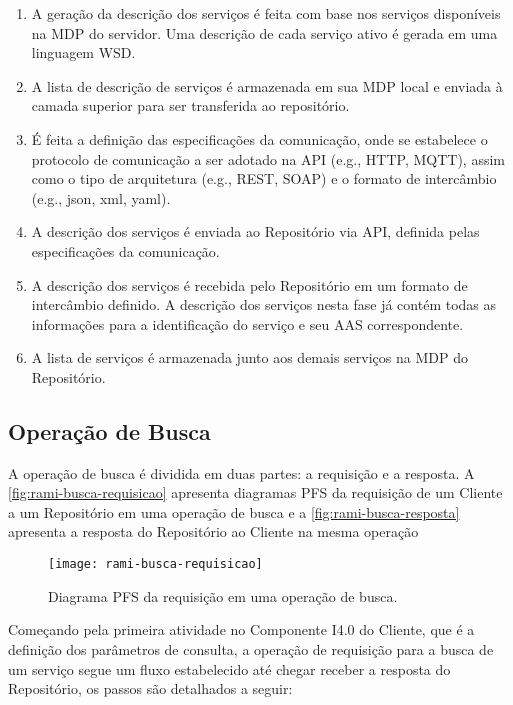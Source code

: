 	\begin{enumerate}
		\item A geração da descrição dos serviços é feita com base nos serviços disponíveis na MDP do servidor. Uma descrição de cada serviço ativo é gerada em uma linguagem WSD.
		\item A lista de descrição de serviços é armazenada em sua MDP local e enviada à camada superior para ser transferida ao repositório.
		\item É feita a definição das especificações da comunicação, onde se estabelece o protocolo de comunicação a ser adotado na API (e.g., HTTP, MQTT), assim como o tipo de arquitetura (e.g., REST, SOAP) e o formato de intercâmbio (e.g., json, xml, yaml).
		\item A descrição dos serviços é enviada ao Repositório via API, definida pelas especificações da comunicação.
		\item A descrição dos serviços é recebida pelo Repositório em um formato de intercâmbio definido. A descrição dos serviços nesta fase já contém todas as informações para a identificação do serviço e seu AAS correspondente.
		\item A lista de serviços é armazenada junto aos demais serviços na MDP do Repositório.
	\end{enumerate}

\subsection{Operação de Busca}

	A operação de busca é dividida em duas partes: a requisição e a resposta. A \autoref{fig:rami-busca-requisicao} apresenta diagramas PFS da requisição de um Cliente a um Repositório em uma operação de busca e a \autoref{fig:rami-busca-resposta} apresenta a resposta do Repositório ao Cliente na mesma operação
	
	\begin{figure}[htb]
		\centering
		\caption{Diagrama PFS da requisição em uma operação de busca.}
		\label{fig:rami-busca-requisicao}
		\texttt{[image: rami-busca-requisicao]}
	\end{figure}

	Começando pela primeira atividade no Componente I4.0 do Cliente, que é a definição dos parâmetros de consulta, a operação de requisição para a busca de um serviço segue um fluxo estabelecido até chegar receber a resposta do Repositório, os passos são detalhados a seguir:
	

